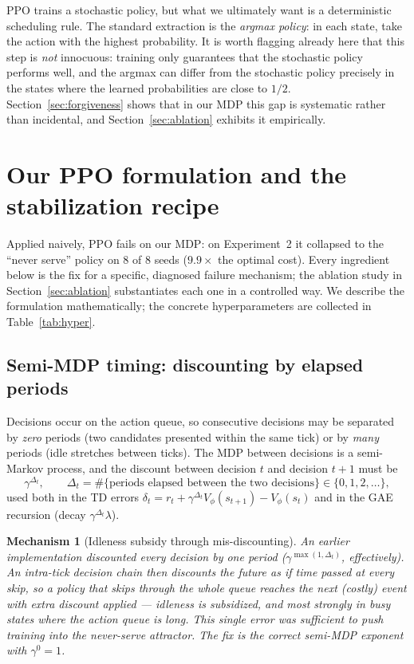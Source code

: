 \documentclass[11pt,a4paper]{article}
\newtheorem{mechanism}{Mechanism}
\begin{document}
PPO trains a stochastic policy, but what we ultimately want is a
deterministic scheduling rule.  The standard extraction is the
\emph{argmax policy}: in each state, take the action with the highest
probability.  It is worth flagging already here that this step is
\emph{not} innocuous: training only guarantees that the stochastic
policy performs well, and the argmax can differ from the stochastic
policy precisely in the states where the learned probabilities are close
to $1/2$.  Section~\ref{sec:forgiveness} shows that in our MDP this gap
is systematic rather than incidental, and
Section~\ref{sec:ablation} exhibits it empirically.

\section{Our PPO formulation and the stabilization recipe}
\label{sec:ours}

Applied naively, PPO fails on our MDP: on Experiment~2 it collapsed to
the ``never serve'' policy on 8 of 8 seeds ($9.9\times$ the optimal
cost).  Every ingredient below is the fix for a specific, diagnosed
failure mechanism; the ablation study in Section~\ref{sec:ablation}
substantiates each one in a controlled way.  We describe the
formulation mathematically; the concrete hyperparameters are collected
in Table~\ref{tab:hyper}.

\subsection{Semi-MDP timing: discounting by elapsed periods}
\label{sec:dper}

Decisions occur on the action queue, so consecutive decisions may be
separated by \emph{zero} periods (two candidates presented within the
same tick) or by \emph{many} periods (idle stretches between ticks).
The MDP between decisions is a semi-Markov process, and the discount
between decision $t$ and decision $t{+}1$ must be
\begin{equation}
  \gamma^{\Delta_t}, \qquad
  \Delta_t = \#\{\text{periods elapsed between the two decisions}\}
  \in \{0, 1, 2, \dots\},
\end{equation}
used both in the TD errors
$\delta_t = r_t + \gamma^{\Delta_t} V_\phi(s_{t+1}) - V_\phi(s_t)$
and in the GAE recursion (decay $\gamma^{\Delta_t}\lambda$).

\begin{mechanism}[Idleness subsidy through mis-discounting]
\label{mech:dper}
An earlier implementation discounted \emph{every} decision by one period
($\gamma^{\max(1,\Delta_t)}$, effectively).  An intra-tick decision
chain then discounts the future as if time passed at every skip, so a
policy that skips through the whole queue reaches the next (costly)
event with extra discount applied --- idleness is \emph{subsidized}, and
most strongly in busy states where the action queue is long.  This
single error was sufficient to push training into the never-serve
attractor.  The fix is the correct semi-MDP exponent with
$\gamma^0 = 1$.
\end{mechanism}
\end{document}
